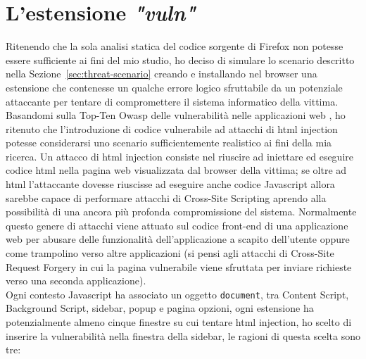 \documentclass{sapthesis}
\newcommand{\code}[1]{\texttt{#1}}
\newcommand{\Sezione}[1]{Sezione~\ref{#1}}
\newcommand{\vuln}{\textit{"vuln"}}
\newcommand{\JS}{Javascript }
\begin{document}
    \section{L'estensione \vuln}
    \label{sec:estensione-vuln}
        Ritenendo che la sola analisi statica del codice sorgente di Firefox non potesse essere
        sufficiente ai fini del mio studio, ho deciso di simulare lo scenario descritto nella
        \Sezione{sec:threat-scenario} creando e installando nel browser una estensione che contenesse
        un qualche errore logico sfruttabile da un potenziale attaccante per tentare di compromettere
        il sistema informatico della vittima.
        Basandomi sulla Top-Ten Owasp delle vulnerabilità nelle applicazioni web \cite{owasp-top-ten}, ho ritenuto
        che l'introduzione di codice vulnerabile ad attacchi di html injection potesse considerarsi uno scenario
        sufficientemente realistico ai fini della mia ricerca.
        Un attacco di html injection consiste nel riuscire ad iniettare ed eseguire codice html nella pagina web
        visualizzata dal browser della vittima; se oltre ad html l'attaccante dovesse riuscisse ad eseguire anche 
        codice \JS allora sarebbe capace di performare attacchi di Cross-Site Scripting aprendo alla possibilità
        di una ancora più profonda compromissione del sistema. Normalmente questo genere di attacchi viene
        attuato sul codice front-end di una applicazione web per abusare delle funzionalità dell'applicazione
        a scapito dell'utente oppure come trampolino verso altre applicazioni (si pensi agli
        attacchi di Cross-Site Request Forgery in cui la pagina vulnerabile viene sfruttata per
        inviare richieste verso una seconda applicazione).\\
        Ogni contesto \JS ha associato un oggetto \code{document}, tra Content Script, Background Script, sidebar,
        popup e pagina opzioni, ogni estensione ha potenzialmente almeno cinque finestre su cui tentare
        html injection, ho scelto di inserire la vulnerabilità nella finestra della sidebar, le ragioni di
        questa scelta sono tre:
\end{document}
